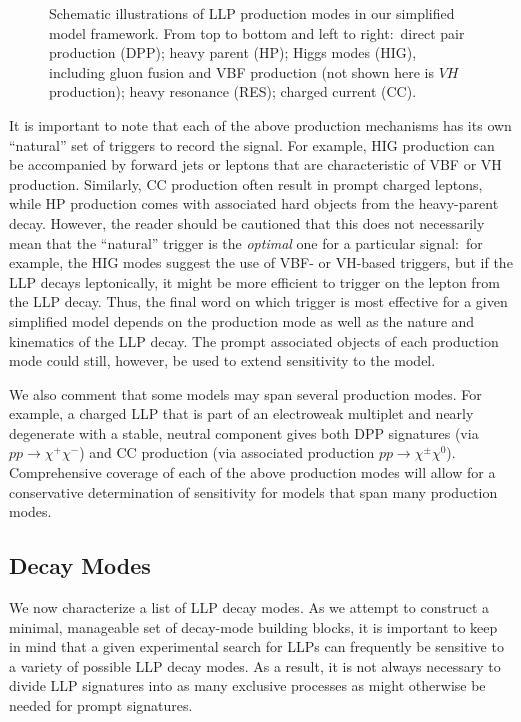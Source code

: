 \begin{figure}[t]
  \caption{Schematic illustrations of LLP production modes in our simplified model framework. From top to bottom and left to right:~direct pair production (DPP); heavy parent (HP); Higgs modes (HIG), including gluon fusion and VBF production (not shown here is $VH$ production); heavy resonance (RES); charged current (CC).}
  \label{fig:feyndiagram}
\end{figure}

It is important to note that each of the above production mechanisms has its own ``natural'' set of triggers to record the signal. For example, HIG production can be accompanied by forward jets or leptons that are characteristic of VBF or VH production. Similarly,  CC production  often result in prompt charged leptons,  while HP production comes with associated hard objects from the heavy-parent decay. However, the reader should be cautioned that this does not necessarily mean that the ``natural'' trigger is the \emph{optimal} one for a particular signal:~for example, the HIG modes suggest the use of VBF- or VH-based triggers, but if the LLP decays leptonically, it might be more efficient to trigger on the lepton from the LLP decay. Thus, the final word on which trigger is most effective for a given simplified model depends on the production mode as well as the nature and kinematics of the LLP decay. The prompt associated objects of each production mode could still, however, be used to extend sensitivity to the model.

We also comment that some models may span several production modes. For example, a charged LLP that is part of an electroweak multiplet and nearly degenerate with a stable, neutral component \cite{Chen:1995yu,Thomas:1998wy,Feng:1999fu,
Cirelli:2005uq,Ibe:2006de,Cirelli:2009uv,FileviezPerez:2008bj,Buckley:2009kv,Mahbubani:2017gjh} gives both DPP signatures (via $pp\rightarrow \chi^+\chi^-$) and CC production (via associated production $pp\rightarrow\chi^\pm\chi^0$). Comprehensive coverage of each of the above production modes will allow for a conservative determination of sensitivity for models that span many production modes.


\subsection{Decay Modes}\label{sec:decmodes}


We now characterize a list of LLP decay modes. As we attempt to construct
a minimal, manageable set of decay-mode building blocks, it is important to keep in mind that a given experimental search for LLPs can frequently be
sensitive to a variety of possible LLP decay modes. As a result, it is not always necessary to divide LLP signatures into as many exclusive processes as might otherwise be needed for prompt signatures.

